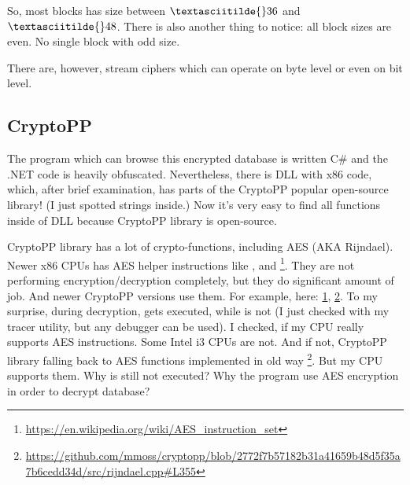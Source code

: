 \begin{figure}[H]
\centering
{}
\end{figure}

So, most blocks has size between $\textasciitilde{}36$ and $\textasciitilde{}48$.
There is also another thing to notice: all block sizes are even.
No single block with odd size.

There are, however, stream ciphers which can operate on byte level or even on bit level.

\subsection{CryptoPP}

The program which can browse this encrypted database is written C\# and the .NET code
is heavily obfuscated.
Nevertheless, there is DLL with x86 code, which, after brief examination,
has parts of the CryptoPP popular open-source library!
(I just spotted  strings inside.)
Now it's very easy to find all functions inside of DLL because CryptoPP library is open-source.

CryptoPP library has a lot of crypto-functions, including AES (AKA Rijndael).
Newer x86 CPUs has AES helper instructions like ,  and 
\footnote{\url{https://en.wikipedia.org/wiki/AES_instruction_set}}.
They are not performing encryption/decryption completely, but they do significant amount of job.
And newer CryptoPP versions use them.
For example, here:
\href{https://github.com/mmoss/cryptopp/blob/2772f7b57182b31a41659b48d5f35a7b6cedd34d/src/rijndael.cpp#L1034}{1},
\href{https://github.com/mmoss/cryptopp/blob/2772f7b57182b31a41659b48d5f35a7b6cedd34d/src/rijndael.cpp#L1000}{2}.
To my surprise, during decryption,  gets executed, while  is not
(I just checked with my tracer utility, but any debugger can be used).
I checked, if my CPU really supports AES instructions. Some Intel i3 CPUs are not.
And if not, CryptoPP library falling back to AES functions implemented in old way
\footnote{\url{https://github.com/mmoss/cryptopp/blob/2772f7b57182b31a41659b48d5f35a7b6cedd34d/src/rijndael.cpp#L355}}.
But my CPU supports them.
Why  is still not executed?
Why the program use AES encryption in order to decrypt database?

